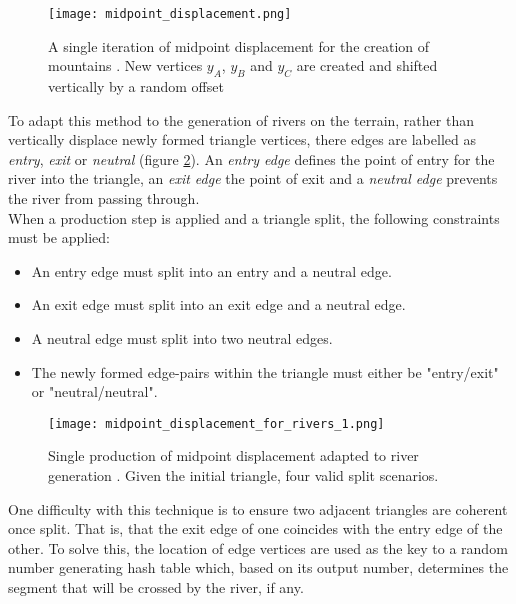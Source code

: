 \begin{figure}[h]
  \centering
	\texttt{[image: midpoint\_displacement.png]}
	\caption{A single iteration of midpoint displacement for the creation of mountains \cite{Prusinkiewicz1993}. New vertices $y_{A}$, $y_{B}$ and $y_{C}$ are created and shifted vertically by a random offset}
	\label{fig:midpoint_displacement}
\end{figure}

To adapt this method to the generation of rivers on the terrain, rather than vertically displace newly formed triangle vertices, there edges are labelled as \textit{entry}, \textit{exit} or \textit{neutral} (figure \ref{fig:single_prod_of_midpoint_displacement}). An \textit{entry edge} defines the point of entry for the river into the triangle, an \textit{exit edge} the point of exit and a \textit{neutral edge} prevents the river from passing through. \\

When a production step is applied and a triangle split, the following constraints must be applied:
\begin{itemize}
\item An entry edge must split into an entry and a neutral edge.
\item An exit edge must split into an exit edge and a neutral edge.
\item A neutral edge must split into two neutral edges.
\item The newly formed edge-pairs within the triangle must either be "entry/exit" or "neutral/neutral".
\end{itemize}

\begin{figure}[h]
  \centering
	\texttt{[image: midpoint\_displacement\_for\_rivers\_1.png]}
	\caption{Single production of midpoint displacement adapted to river generation \cite{Prusinkiewicz1993}. Given the initial triangle, four valid split scenarios.}
	\label{fig:single_prod_of_midpoint_displacement}
\end{figure}

One difficulty with this technique is to ensure two adjacent triangles are coherent once split. That is, that the exit edge of one coincides with the entry edge of the other. To solve this, the location of edge vertices are used as the key to a random number generating hash table which, based on its output number, determines the segment that will be crossed by the river, if any.  \\

